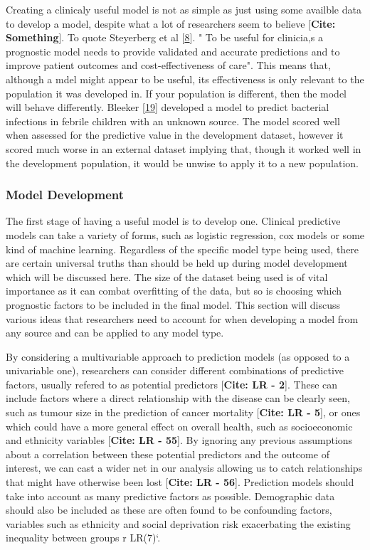 \documentclass[
]{article}
\begin{document}
Creating a clinicaly useful model is not as simple as just using some availble data to develop a model, despite what a lot of researchers seem to believe {[}\textbf{Cite: Something}{]}. To quote Steyerberg et al {[}\protect\hyperlink{ref-steyerberg_prognosis_2013}{8}{]}. " To be useful for clinicia,s a prognostic model needs to provide validated and accurate predictions and to improve patient outcomes and cost-effectiveness of care". This means that, although a mdel might appear to be useful, its effectiveness is only relevant to the population it was developed in. If your population is different, then the model will behave differently. Bleeker {[}\protect\hyperlink{ref-bleeker_external_2003}{19}{]} developed a model to predict bacterial infections in febrile children with an unknown source. The model scored well when assessed for the predictive value in the development dataset, however it scored much worse in an external dataset implying that, though it worked well in the development population, it would be unwise to apply it to a new population.

\hypertarget{model-development}{%
\subsubsection{Model Development}\label{model-development}}

The first stage of having a useful model is to develop one. Clinical predictive models can take a variety of forms, such as logistic regression, cox models or some kind of machine learning. Regardless of the specific model type being used, there are certain universal truths than should be held up during model development which will be discussed here. The size of the dataset being used is of vital importance as it can combat overfitting of the data, but so is choosing which prognostic factors to be included in the final model. This section will discuss various ideas that researchers need to account for when developing a model from any source and can be applied to any model type.

By considering a multivariable approach to prediction models (as opposed to a univariable one), researchers can consider different combinations of predictive factors, usually refered to as potential predictors {[}\textbf{Cite: LR - 2}{]}. These can include factors where a direct relationship with the disease can be clearly seen, such as tumour size in the prediction of cancer mortality {[}\textbf{Cite: LR - 5}{]}, or ones which could have a more general effect on overall health, such as socioeconomic and ethnicity variables {[}\textbf{Cite: LR - 55}{]}. By ignoring any previous assumptions about a correlation between these potential predictors and the outcome of interest, we can cast a wider net in our analysis allowing us to catch relationships that might have otherwise been lost {[}\textbf{Cite: LR - 56}{]}. Prediction models should take into account as many predictive factors as possible. Demographic data should also be included as these are often found to be confounding factors, variables such as ethnicity and social deprivation risk exacerbating the existing inequality between groups r LR(7)`.
\end{document}
